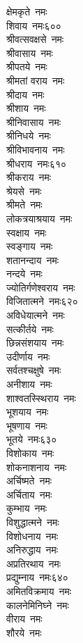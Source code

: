 \begin{multicols}{2}
\begin{flushleft}
क्षेमकृते~नमः\\
शिवाय~नमः\hfill ६००\\
श्रीवत्सवक्षसे~नमः\\
श्रीवासाय~नमः\\
श्रीपतये~नमः\\
श्रीमतां वराय~नमः\\
श्रीदाय~नमः\\
श्रीशाय~नमः\\
श्रीनिवासाय~नमः\\
श्रीनिधये~नमः\\
श्रीविभावनाय~नमः\\
श्रीधराय~नमः\hfill ६१०\\
श्रीकराय~नमः\\
श्रेयसे~नमः\\
श्रीमते~नमः\\
लोकत्रयाश्रयाय~नमः\\
स्वक्षाय~नमः\\
स्वङ्गाय~नमः\\
शतानन्दाय~नमः\\
नन्दये~नमः\\
ज्योतिर्गणेश्वराय~नमः\\
विजितात्मने~नमः\hfill ६२०\\
अविधेयात्मने~नमः\\
सत्कीर्तये~नमः\\
छिन्नसंशयाय~नमः\\
उदीर्णाय~नमः\\
सर्वतश्चक्षुषे~नमः\\
अनीशाय~नमः\\
शाश्वतस्स्थिराय~नमः\\
भूशयाय~नमः\\
भूषणाय~नमः\\
भूतये~नमः\hfill ६३०\\
विशोकाय~नमः\\
शोकनाशनाय~नमः\\
अर्चिष्मते~नमः\\
अर्चिताय~नमः\\
कुम्भाय~नमः\\
विशुद्धात्मने~नमः\\
विशोधनाय~नमः\\
अनिरुद्धाय~नमः\\
अप्रतिरथाय~नमः\\
प्रद्युम्नाय~नमः\hfill ६४०\\
अमितविक्रमाय~नमः\\
कालनेमिनिघ्ने~नमः\\
वीराय~नमः\\
शौरये~नमः\\

\end{flushleft}
\end{multicols}
